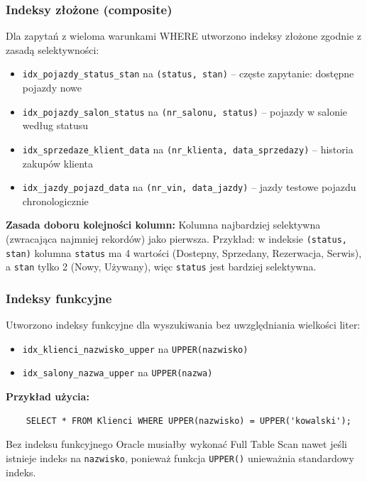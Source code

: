 \documentclass[a4paper,titleauthor]{mwart}
\begin{document}
	\subsubsection{Indeksy złożone (composite)}

	Dla zapytań z wieloma warunkami WHERE utworzono indeksy złożone zgodnie z zasadą selektywności:

	\begin{itemize}
		\item \texttt{idx\_pojazdy\_status\_stan} na \texttt{(status, stan)} -- częste zapytanie: dostępne pojazdy nowe
		\item \texttt{idx\_pojazdy\_salon\_status} na \texttt{(nr\_salonu, status)} -- pojazdy w salonie według statusu
		\item \texttt{idx\_sprzedaze\_klient\_data} na \texttt{(nr\_klienta, data\_sprzedazy)} -- historia zakupów klienta
		\item \texttt{idx\_jazdy\_pojazd\_data} na \texttt{(nr\_vin, data\_jazdy)} -- jazdy testowe pojazdu chronologicznie
	\end{itemize}

	\textbf{Zasada doboru kolejności kolumn:} Kolumna najbardziej selektywna (zwracająca najmniej rekordów) jako pierwsza. Przykład: w indeksie \texttt{(status, stan)} kolumna \texttt{status} ma 4 wartości (Dostepny, Sprzedany, Rezerwacja, Serwis), a \texttt{stan} tylko 2 (Nowy, Używany), więc \texttt{status} jest bardziej selektywna.

	\subsubsection{Indeksy funkcyjne}

	Utworzono indeksy funkcyjne dla wyszukiwania bez uwzględniania wielkości liter:

	\begin{itemize}
		\item \texttt{idx\_klienci\_nazwisko\_upper} na \texttt{UPPER(nazwisko)}
		\item \texttt{idx\_salony\_nazwa\_upper} na \texttt{UPPER(nazwa)}
	\end{itemize}

	\textbf{Przykład użycia:}
	\begin{verbatim}
	SELECT * FROM Klienci WHERE UPPER(nazwisko) = UPPER('kowalski');
	\end{verbatim}

	Bez indeksu funkcyjnego Oracle musiałby wykonać Full Table Scan nawet jeśli istnieje indeks na \texttt{nazwisko}, ponieważ funkcja \texttt{UPPER()} unieważnia standardowy indeks.
\end{document}
